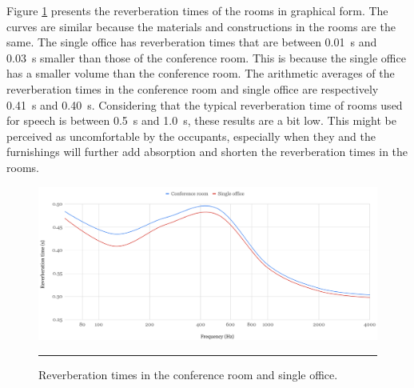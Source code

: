 Figure \ref{fig:reverb_times} presents the reverberation times of the rooms in graphical form.
The curves are similar because the materials and constructions in the rooms are the same.
The single office has reverberation times that are between 0.01~s and 0.03~s smaller than those of the conference room.
This is because the single office has a smaller volume than the conference room.
The arithmetic averages of the reverberation times in the conference room and single office are respectively 0.41~s and 0.40~s.
Considering that the typical reverberation time of rooms used for speech is between 0.5~s and 1.0~s, these results are a bit low.
This might be perceived as uncomfortable by the occupants, especially when they and the furnishings will further add absorption and shorten the reverberation times in the rooms.









\begin{figure}[htbp]
	\centering
	\includegraphics[width=\textwidth]{figures/Reverb_times.png}
	\rule{\textwidth}{0.5pt} %
	\caption{Reverberation times in the conference room and single office.}
	\label{fig:reverb_times}
\end{figure}